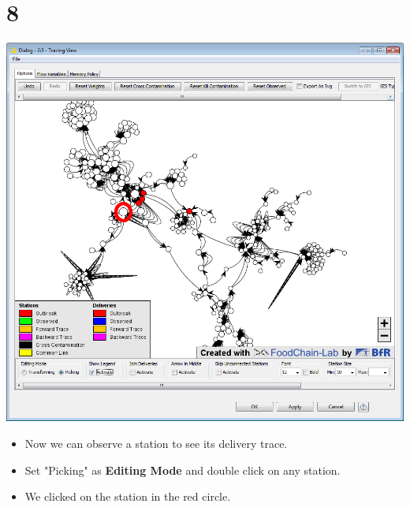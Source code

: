 \documentclass{beamer}
\begin{document}
\section{8}
\begin{frame}
	\begin{center}
  		\includegraphics[height=0.6\textheight]{8.png}
	\end{center}
	\begin{itemize}
		\item Now we can observe a station to see its delivery trace.
		\item Set "Picking" as \textbf{Editing Mode} and double click on any station.
		\item We clicked on the station in the red circle.
	\end{itemize}
\end{frame}
\end{document}
